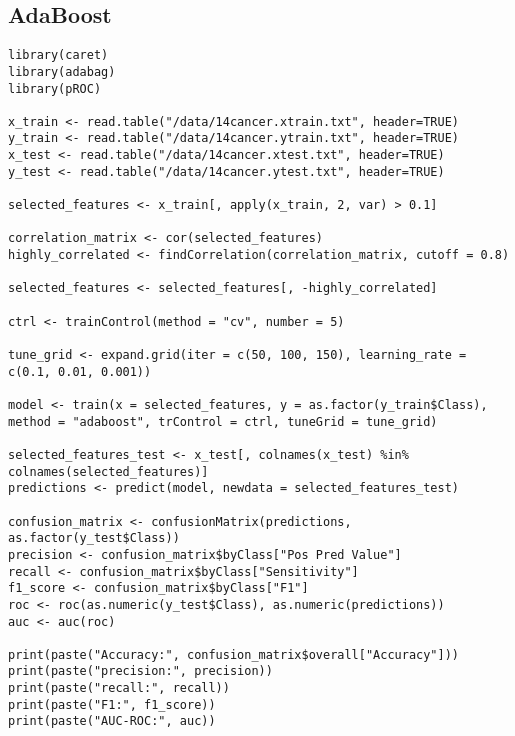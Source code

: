 \documentclass{article}
\begin{document}
\subsection{AdaBoost}
\begin{lstlisting}
library(caret)
library(adabag)
library(pROC)

x_train <- read.table("/data/14cancer.xtrain.txt", header=TRUE)
y_train <- read.table("/data/14cancer.ytrain.txt", header=TRUE)
x_test <- read.table("/data/14cancer.xtest.txt", header=TRUE)
y_test <- read.table("/data/14cancer.ytest.txt", header=TRUE)

selected_features <- x_train[, apply(x_train, 2, var) > 0.1]

correlation_matrix <- cor(selected_features)
highly_correlated <- findCorrelation(correlation_matrix, cutoff = 0.8)

selected_features <- selected_features[, -highly_correlated]

ctrl <- trainControl(method = "cv", number = 5)

tune_grid <- expand.grid(iter = c(50, 100, 150), learning_rate = c(0.1, 0.01, 0.001))

model <- train(x = selected_features, y = as.factor(y_train$Class), method = "adaboost", trControl = ctrl, tuneGrid = tune_grid)

selected_features_test <- x_test[, colnames(x_test) %in% colnames(selected_features)]
predictions <- predict(model, newdata = selected_features_test)

confusion_matrix <- confusionMatrix(predictions, as.factor(y_test$Class))
precision <- confusion_matrix$byClass["Pos Pred Value"]
recall <- confusion_matrix$byClass["Sensitivity"]
f1_score <- confusion_matrix$byClass["F1"]
roc <- roc(as.numeric(y_test$Class), as.numeric(predictions))
auc <- auc(roc)

print(paste("Accuracy:", confusion_matrix$overall["Accuracy"]))
print(paste("precision:", precision))
print(paste("recall:", recall))
print(paste("F1:", f1_score))
print(paste("AUC-ROC:", auc))
\end{lstlisting}
\newpage
\end{document}

